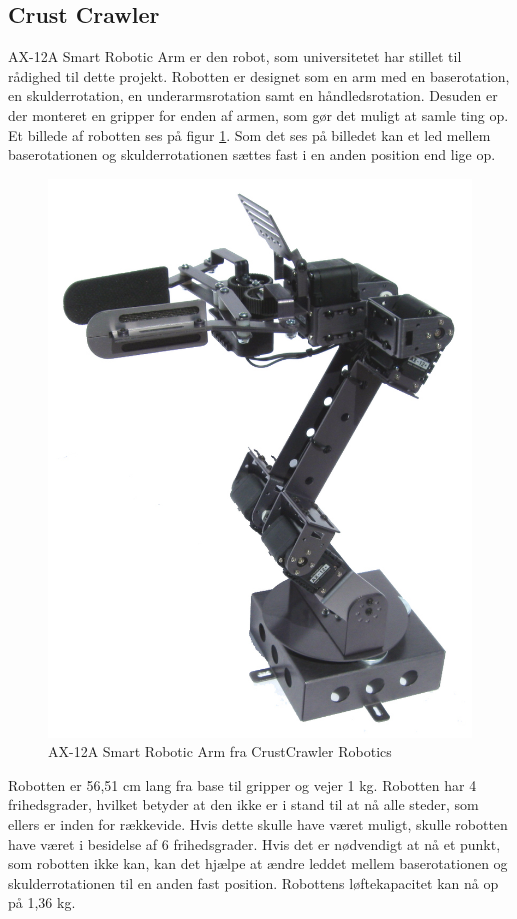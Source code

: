 \subsection{Crust Crawler} %
\label{sub:crust_crawler}

AX-12A Smart Robotic Arm er den robot, som universitetet har stillet til rådighed til dette projekt. Robotten er designet som en arm med en baserotation, en skulderrotation, en underarmsrotation samt en håndledsrotation. Desuden er der monteret en gripper for enden af armen, som gør det muligt at samle ting op. Et billede af robotten ses på figur \ref{fig:crustcrawler}. Som det ses på billedet kan et led mellem baserotationen og skulderrotationen sættes fast i en anden position end lige op. \\

\begin{figure}[h]
\centering
\includegraphics[scale=0.45]{images/crustCrawler}
\caption{AX-12A Smart Robotic Arm fra CrustCrawler Robotics}
\label{fig:crustcrawler}
\end{figure}

Robotten er 56,51 cm lang fra base til gripper og vejer 1 kg. Robotten har 4 frihedsgrader, hvilket betyder at den ikke er i stand til at nå alle steder, som ellers er inden for rækkevide. Hvis dette skulle have været muligt, skulle robotten have været i besidelse af 6 frihedsgrader. Hvis det er nødvendigt at nå et punkt, som robotten ikke kan, kan det hjælpe at ændre leddet mellem baserotationen og skulderrotationen til en anden fast position. Robottens løftekapacitet kan nå op på 1,36 kg.

